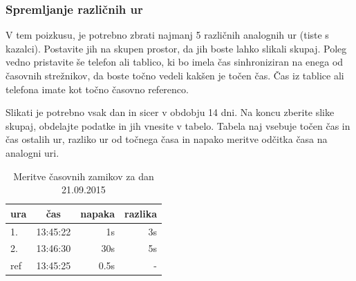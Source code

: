 \subsubsection{Spremljanje različnih ur}
V tem poizkusu, je potrebno zbrati najmanj 5 različnih analognih ur (tiste s kazalci). Postavite jih na skupen prostor, da jih boste lahko slikali skupaj. Poleg vedno pristavite še telefon ali tablico, ki bo imela čas sinhroniziran na enega od časovnih strežnikov, da boste točno vedeli kakšen je točen čas. Čas iz tablice ali telefona imate kot točno časovno referenco. 

Slikati je potrebno vsak dan in sicer v obdobju 14 dni. Na koncu zberite slike skupaj, obdelajte podatke in jih vnesite v tabelo. Tabela naj vsebuje točen čas in čas ostalih ur, razliko ur od točnega časa in napako meritve odčitka časa na analogni uri.

\begin{table}
	\centering
	\caption{Meritve časovnih zamikov za dan 21.09.2015}
	\label{tab:v_cas_meritev} 
	\begin{tabular}{l||c|r|r}
		\hline
		ura & čas & napaka & razlika  \\
	    \hline\hline\noalign{\smallskip}
		1.  & 13:45:22 & 1s   & 3s\\
		2.  & 13:46:30 & 30s  & 5s\\
		ref & 13:45:25 & 0.5s & - 
	\end{tabular}
\end{table}

